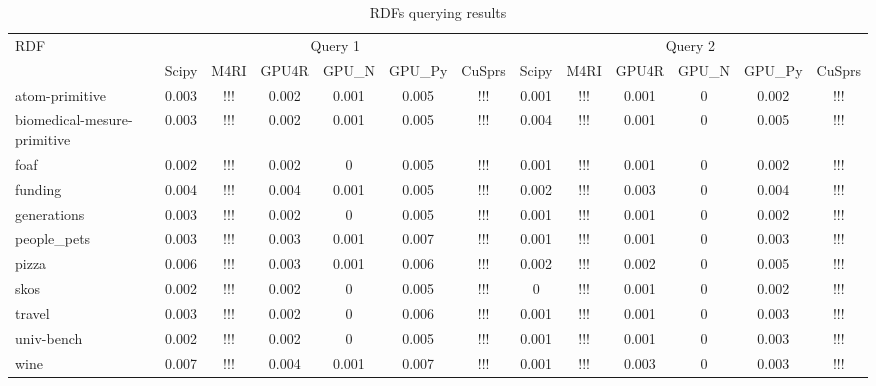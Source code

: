 \begin{table*}
\caption{RDFs querying results}
\label{tbl:tableRDF}
\begin{tabular}{| l | c | c | c | c | c | c | c | c | c | c | c | c |}
    \hline
    \multirow{2}{*}{RDF}        & \multicolumn{6}{|c|}{Query 1}                               & \multicolumn{6}{|c|}{Query 2} \\
    \cline{2-13}
                                & Scipy & M4RI & GPU4R & GPU\_N & GPU\_Py & CuSprs & Scipy & M4RI & GPU4R & GPU\_N & GPU\_Py & CuSprs \\
    \hline
    \hline
    atom-primitive              & 0.003 & !!!  & 0.002 & 0.001  & 0.005   & !!!    & 0.001 & !!!  & 0.001 & 0      & 0.002   & !!!    \\
    biomedical-mesure-primitive & 0.003 & !!!  & 0.002 & 0.001  & 0.005   & !!!    & 0.004 & !!!  & 0.001 & 0      & 0.005   & !!!    \\
    foaf                        & 0.002 & !!!  & 0.002 & 0      & 0.005   & !!!    & 0.001 & !!!  & 0.001 & 0      & 0.002   & !!!    \\
    funding                     & 0.004 & !!!  & 0.004 & 0.001  & 0.005   & !!!    & 0.002 & !!!  & 0.003 & 0      & 0.004   & !!!    \\
    generations                 & 0.003 & !!!  & 0.002 & 0      & 0.005   & !!!    & 0.001 & !!!  & 0.001 & 0      & 0.002   & !!!    \\
    people\_pets                 & 0.003 & !!!  & 0.003 & 0.001  & 0.007   & !!!    & 0.001 & !!!  & 0.001 & 0      & 0.003   & !!!    \\
    pizza                       & 0.006 & !!!  & 0.003 & 0.001  & 0.006   & !!!    & 0.002 & !!!  & 0.002 & 0      & 0.005   & !!!    \\
    skos                        & 0.002 & !!!  & 0.002 & 0      & 0.005   & !!!    & 0     & !!!  & 0.001 & 0      & 0.002   & !!!    \\
    travel                      & 0.003 & !!!  & 0.002 & 0      & 0.006   & !!!    & 0.001 & !!!  & 0.001 & 0      & 0.003   & !!!    \\
    univ-bench                  & 0.002 & !!!  & 0.002 & 0      & 0.005   & !!!    & 0.001 & !!!  & 0.001 & 0      & 0.003   & !!!    \\
    wine                        & 0.007 & !!!  & 0.004 & 0.001  & 0.007   & !!!    & 0.001 & !!!  & 0.003 & 0      & 0.003   & !!!    \\
    \hline
  \end{tabular}
\end{table*}


